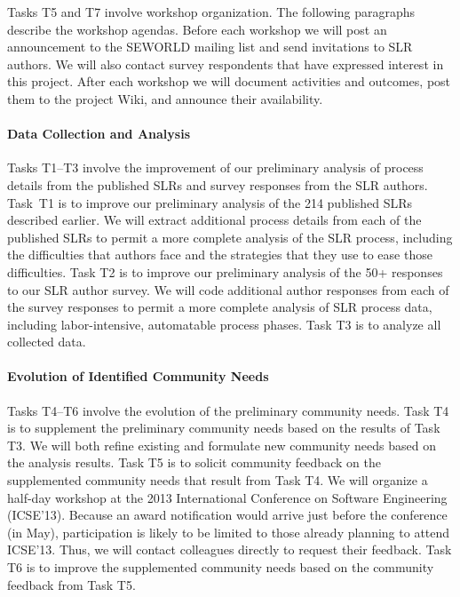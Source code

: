 \vspace*{-6pt}
Tasks T5 and T7 involve workshop organization.
The following paragraphs describe the workshop agendas.
Before each workshop we will post an announcement to the SEWORLD mailing list and send invitations to SLR authors.
We will also contact survey respondents that have expressed interest in this project.
After each workshop we will document activities and outcomes, post them to the project Wiki, and announce their availability.

\paragraph{Data Collection and Analysis}
Tasks T1--T3 involve the improvement of our preliminary analysis of process details from the published SLRs and survey responses from the SLR authors.
Task~T1 is to improve our preliminary analysis of the 214 published SLRs described earlier.
We will extract additional process details from each of the published SLRs to permit a more complete
analysis of the SLR process, including the difficulties that authors face and the strategies that they use to ease those difficulties.
Task T2 is to improve our preliminary analysis of the 50+ responses to our SLR author survey.
We will code additional author responses from each of the survey responses to permit a more complete
analysis of SLR process data, %
including labor-intensive, automatable process phases. %
Task T3 is to analyze all collected data. %

\paragraph{Evolution of Identified Community Needs}
Tasks T4--T6 involve the evolution of the preliminary community needs. %
Task T4 is to supplement the preliminary community needs based on the results of Task T3.
We will both refine existing and formulate new community needs based on the analysis results.
Task T5 is to solicit community feedback on the supplemented community needs that result from Task T4.
We will organize a half-day workshop at the 2013 International Conference on Software Engineering (ICSE'13). %
Because an award notification would arrive just before the conference (in May),
participation is likely to be limited to those already planning to attend ICSE'13.
Thus, we will contact colleagues directly to request their feedback. %
Task T6 is to improve the supplemented community needs based on the community feedback from Task T5. %

